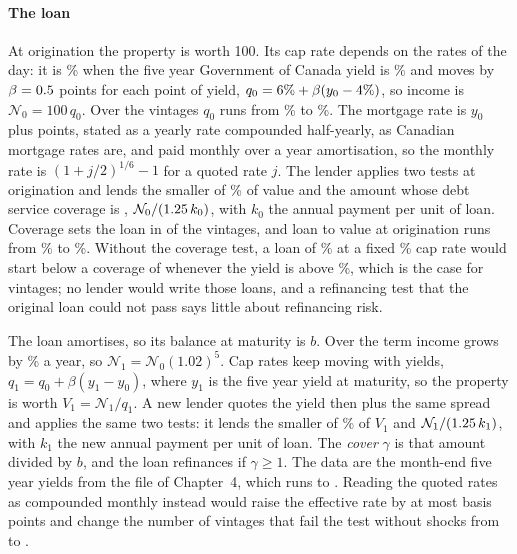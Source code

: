 \begin{chapterrefs}
\paragraph{The loan}
At origination the property is worth 100. Its cap rate depends on the rates of the day: it is
\csCap\% when the five year Government of Canada yield is \csYRef\% and moves by $\beta=0.5$ points
for each point of yield, $q_0=6\%+\beta(y_0-4\%)$, so income is $\mathcal N_0=100\,q_0$.
Over the vintages $q_0$ runs from \csCapZeroMin\% to \csCapZeroMax\%. The mortgage rate is $y_0$ plus
\csSpread{} points, stated as a yearly rate compounded half-yearly, as Canadian mortgage rates are,
and paid monthly over a \csAmort{} year amortisation, so the monthly rate is $(1+j/2)^{1/6}-1$ for a
quoted rate $j$. The lender applies two tests at origination and lends the smaller of \csLtv\% of value
and the amount whose debt service coverage is \csDscrMin, $\mathcal N_0/(1.25\,k_0)$, with $k_0$
the annual payment per unit of loan. Coverage sets the loan in \csDscrBindsZero{} of the \csN{}
vintages, and loan to value at origination runs from \csLtvZeroMin\% to \csLtvZeroMax\%. Without the
coverage test, a loan of \csLtv\% at a fixed \csCap\% cap rate would start below a coverage of
\csDscrMin{} whenever the yield is above \csOldYCut\%, which is the case for \csOldBelow{} vintages; no
lender would write those loans, and a refinancing test that the original loan could not pass says
little about refinancing risk.

The loan amortises, so its balance at maturity is $b$. Over the term income grows by \csG\% a year,
so $\mathcal N_1=\mathcal N_0(1.02)^5$. Cap rates keep moving with yields,
$q_1=q_0+\beta(y_1-y_0)$, where $y_1$ is the five year yield at maturity, so the property is worth
$V_1=\mathcal N_1/q_1$. A new lender quotes the yield then plus the same spread and applies the same
two tests: it lends the smaller of \csLtv\% of $V_1$ and $\mathcal N_1/(1.25\,k_1)$, with $k_1$ the
new annual payment per unit of loan. The \emph{cover} $\gamma$ is that amount divided by $b$, and the
loan refinances if $\gamma\ge1$. The data are the month-end five year yields from the file of
Chapter~4, which runs to \csMatLast. Reading the quoted rates as compounded monthly instead would raise
the effective rate by at most \csConvMax{} basis points and change the number of vintages that fail the
test without shocks from \csFails{} to \csMonthlyFails.


\end{chapterrefs}
